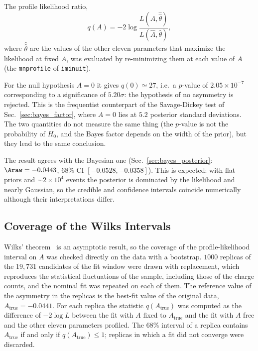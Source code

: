 The profile likelihood ratio,
\[
q(A) = -2\log\frac{L(A,\hat{\hat\theta})}{L(\hat A,\hat\theta)},
\]
where $\hat{\hat\theta}$ are the values of the other eleven parameters that maximize the likelihood at fixed $A$, was evaluated by re-minimizing them at each value of $A$ (the \texttt{mnprofile} of \texttt{iminuit}).


For the null hypothesis $A=0$ it gives $q(0)\simeq27$, i.e.\ a $p$-value of $2.05\times10^{-7}$ corresponding to a significance of $5.20\sigma$: the hypothesis of no asymmetry is rejected. This is the frequentist counterpart of the Savage-Dickey test of Sec.~\ref{sec:bayes_factor}, where $A=0$ lies at $5.2$ posterior standard deviations.%
The two quantities do not measure the same thing (the $p$-value is not the probability of $H_0$, and the Bayes factor depends on the width of the prior), but they lead to the same conclusion.

The result agrees with the Bayesian one (Sec.~\ref{sec:bayes_posterior}: $\Araw=-0.0443$, $68\%$ CI $[-0.0528,-0.0358]$). This is expected: with flat priors and $\sim2\times10^4$ events the posterior is dominated by the likelihood and nearly Gaussian, so the credible and confidence intervals coincide numerically although their interpretations differ.

\subsection{Coverage of the Wilks Intervals}
\label{sec:freq_coverage}

Wilks' theorem~\cite{wilks} is an asymptotic result, so the coverage of the profile-likelihood interval on $A$ was checked directly on the data with a bootstrap. $1000$ replicas of the $19{,}731$ candidates of the fit window were drawn with replacement, which reproduces the statistical fluctuations of the sample, including those of the charge counts, and the nominal fit was repeated on each of them. The reference value of the asymmetry in the replicas is the best-fit value of the original data, $A_{\mathrm{true}}=-0.0441$. For each replica the statistic $q(A_{\mathrm{true}})$ was computed as the difference of $-2\log L$ between the fit with $A$ fixed to $A_{\mathrm{true}}$ and the fit with $A$ free and the other eleven parameters profiled. The $68\%$ interval of a replica contains $A_{\mathrm{true}}$ if and only if $q(A_{\mathrm{true}})\leq1$; replicas in which a fit did not converge were discarded.

